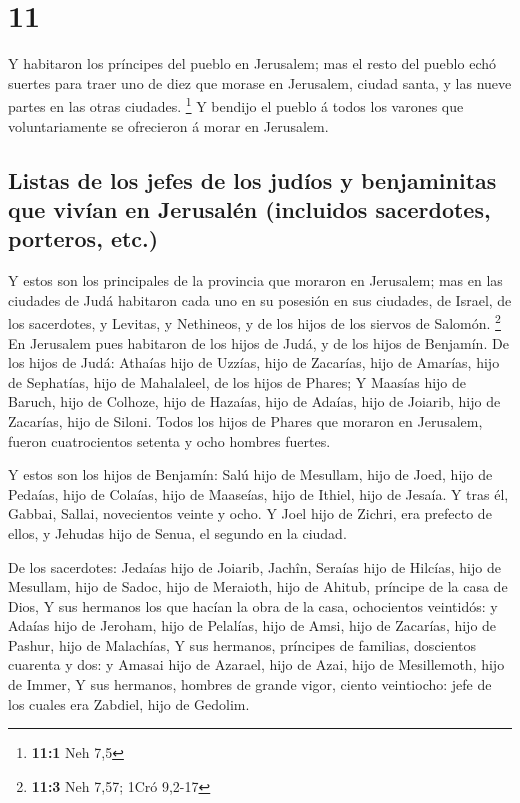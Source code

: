 \hypertarget{section-10}{%
\section{11}\label{section-10}}

 Y habitaron los príncipes del pueblo en Jerusalem; mas el
resto del pueblo echó suertes para traer uno de diez que morase en
Jerusalem, ciudad santa, y las nueve partes en las otras ciudades.
\footnote{\textbf{11:1} Neh 7,5}  Y bendijo el pueblo á
todos los varones que voluntariamente se ofrecieron á morar en
Jerusalem.

\hypertarget{listas-de-los-jefes-de-los-juduxedos-y-benjaminitas-que-vivuxedan-en-jerusaluxe9n-incluidos-sacerdotes-porteros-etc.}{%
\subsection{Listas de los jefes de los judíos y benjaminitas que vivían
en Jerusalén (incluidos sacerdotes, porteros,
etc.)}\label{listas-de-los-jefes-de-los-juduxedos-y-benjaminitas-que-vivuxedan-en-jerusaluxe9n-incluidos-sacerdotes-porteros-etc.}}

 Y estos son los principales de la provincia que moraron
en Jerusalem; mas en las ciudades de Judá habitaron cada uno en su
posesión en sus ciudades, de Israel, de los sacerdotes, y Levitas, y
Nethineos, y de los hijos de los siervos de Salomón. \footnote{\textbf{11:3}
  Neh 7,57; 1Cró 9,2-17}  En Jerusalem pues habitaron de
los hijos de Judá, y de los hijos de Benjamín. De los hijos de Judá:
Athaías hijo de Uzzías, hijo de Zacarías, hijo de Amarías, hijo de
Sephatías, hijo de Mahalaleel, de los hijos de Phares;  Y
Maasías hijo de Baruch, hijo de Colhoze, hijo de Hazaías, hijo de
Adaías, hijo de Joiarib, hijo de Zacarías, hijo de Siloni.
 Todos los hijos de Phares que moraron en Jerusalem,
fueron cuatrocientos setenta y ocho hombres fuertes.

 Y estos son los hijos de Benjamín: Salú hijo de Mesullam,
hijo de Joed, hijo de Pedaías, hijo de Colaías, hijo de Maaseías, hijo
de Ithiel, hijo de Jesaía.  Y tras él, Gabbai, Sallai,
novecientos veinte y ocho.  Y Joel hijo de Zichri, era
prefecto de ellos, y Jehudas hijo de Senua, el segundo en la ciudad.

 De los sacerdotes: Jedaías hijo de Joiarib, Jachîn,
 Seraías hijo de Hilcías, hijo de Mesullam, hijo de
Sadoc, hijo de Meraioth, hijo de Ahitub, príncipe de la casa de Dios,
 Y sus hermanos los que hacían la obra de la casa,
ochocientos veintidós: y Adaías hijo de Jeroham, hijo de Pelalías, hijo
de Amsi, hijo de Zacarías, hijo de Pashur, hijo de Malachías,
 Y sus hermanos, príncipes de familias, doscientos
cuarenta y dos: y Amasai hijo de Azarael, hijo de Azai, hijo de
Mesillemoth, hijo de Immer,  Y sus hermanos, hombres de
grande vigor, ciento veintiocho: jefe de los cuales era Zabdiel, hijo de
Gedolim.

